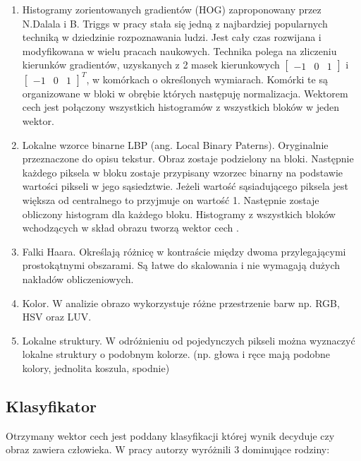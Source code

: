 \begin{enumerate}
\item Histogramy zorientowanych gradientów (HOG) zaproponowany przez N.Dalala i B. Triggs w pracy \cite{dalal2005histograms} stała się jedną z najbardziej popularnych techniką w dziedzinie rozpoznawania ludzi. Jest cały czas rozwijana i modyfikowana w wielu pracach naukowych. Technika polega na zliczeniu kierunków gradientów, uzyskanych z 2 masek kierunkowych \(\begin{bmatrix}-1 & 0 & 1\end{bmatrix} \) i \( \begin{bmatrix}-1 & 0 & 1 \end{bmatrix}^T\), w komórkach o określonych wymiarach. Komórki te są organizowane w bloki w obrębie których następuję normalizacja. Wektorem cech jest połączony wszystkich histogramów z wszystkich bloków w jeden wektor.

\item Lokalne wzorce binarne LBP (ang. Local Binary Paterns).  Oryginalnie przeznaczone do opisu tekstur. Obraz zostaje podzielony na bloki. Następnie każdego piksela w bloku zostaje przypisany wzorzec binarny na podstawie wartości pikseli w jego sąsiedztwie. Jeżeli wartość sąsiadującego piksela jest większa od centralnego to przyjmuje on wartość 1. Następnie zostaje obliczony histogram dla każdego bloku. Histogramy z wszystkich bloków wchodzących w skład obrazu tworzą wektor cech \cite{ojala2002multiresolution}.

\item Falki Haara.
Określają różnicę w kontraście między dwoma przylegającymi prostokątnymi obszarami. Są łatwe do skalowania i nie wymagają dużych nakładów obliczeniowych.

\item Kolor. W analizie obrazo wykorzystuje różne przestrzenie barw np. RGB, HSV oraz LUV. 

\item Lokalne struktury. W odróżnieniu od pojedynczych pikseli można wyznaczyć lokalne struktury o podobnym kolorze. (np. głowa i ręce mają podobne kolory, jednolita koszula, spodnie)


\end{enumerate}

\subsection{Klasyfikator}
Otrzymany wektor cech jest poddany klasyfikacji której wynik decyduje czy obraz zawiera człowieka. W pracy \cite{benenson2014ten} autorzy wyróżnili 3 dominujące rodziny:

